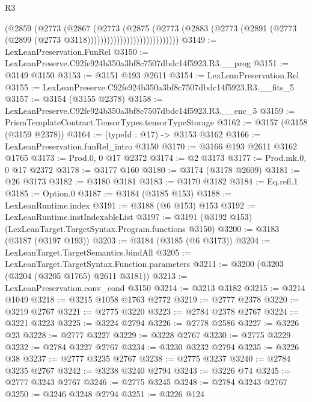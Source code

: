 \begin{lexlean}{R3}
\begin{coremodule}
                                    (@2859
                                      (@2773
                                        (@2867
                                          (@2773
                                            (@2875
                                              (@2773
                                                (@2883
                                                  (@2773
                                                    (@2891
                                                      (@2773
                                                        (@2899
                                                          (@2773 @3118))))))))))))))))))))))))))))
@3149 := LexLeanPreservation.FunRel
@3150 := LexLeanPreserve.C92fe924b350a3bf8c7507dbdc14f5923.R3.__prog
@3151 := @3149 @3150
@3153 := @3151 @193 @2611
@3154 := LexLeanPreservation.Rel
@3155 := LexLeanPreserve.C92fe924b350a3bf8c7507dbdc14f5923.R3.__fits_5
@3157 := @3154 (@3155 @2378)
@3158 := LexLeanPreserve.C92fe924b350a3bf8c7507dbdc14f5923.R3.__enc_5
@3159 := PrismTemplateContract.TensorTypes.tensorTypeStorage
@3162 := @3157 (@3158 (@3159 @2378))
@3164 := (typeId : @17) -> @3153 @3162
@3166 := LexLeanPreservation.funRel_intro @3150
@3170 := @3166 @193 @2611 @3162 @1765
@3173 := Prod.{0, 0} @17 @2372
@3174 := @2 @3173
@3177 := Prod.mk.{0, 0} @17 @2372
@3178 := @3177 @160
@3180 := @3174 (@3178 @2609)
@3181 := @26 @3173
@3182 := @3180 @3181
@3183 := @3170 @3182
@3184 := Eq.refl.{1}
@3185 := Option.{0}
@3187 := @3184 (@3185 @153)
@3188 := LexLeanRuntime.index
@3191 := @3188 (@6 @153) @153
@3192 := LexLeanRuntime.instIndexableList
@3197 := @3191 (@3192 @153) (LexLeanTarget.TargetSyntax.Program.functions @3150)
@3200 := @3183 (@3187 (@3197 @193))
@3203 := @3184 (@3185 (@6 @3173))
@3204 := LexLeanTarget.TargetSemantics.bindAll
@3205 := LexLeanTarget.TargetSyntax.Function.parameters
@3211 := @3200 (@3203 (@3204 (@3205 @1765) @2611 @3181))
@3213 := LexLeanPreservation.conv_cond @3150
@3214 := @3213 @3182
@3215 := @3214 @1049
@3218 := @3215 @1058 @1763 @2772
@3219 := @2777 @2378
@3220 := @3219 @2767
@3221 := @2775 @3220
@3223 := @2784 @2378 @2767
@3224 := @3221 @3223
@3225 := @3224 @2794
@3226 := @2778 @2586
@3227 := @3226 @23
@3228 := @2777 @3227
@3229 := @3228 @2767
@3230 := @2775 @3229
@3232 := @2784 @3227 @2767
@3234 := @3230 @3232 @2794
@3235 := @3226 @38
@3237 := @2777 @3235 @2767
@3238 := @2775 @3237
@3240 := @2784 @3235 @2767
@3242 := @3238 @3240 @2794
@3243 := @3226 @74
@3245 := @2777 @3243 @2767
@3246 := @2775 @3245
@3248 := @2784 @3243 @2767
@3250 := @3246 @3248 @2794
@3251 := @3226 @124

\end{coremodule}
\end{lexlean}
